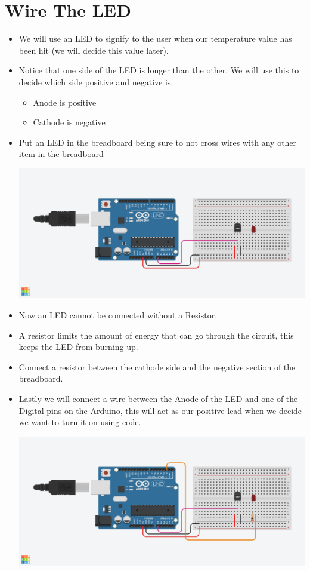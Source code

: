 \documentclass[12pt]{article}
\begin{document}
\section *{Wire The LED}
	\begin{itemize}
		\item We will use an LED to signify to the user when our temperature value has been hit (we will decide this value later). 
		\item Notice that one side of the LED is longer than the other. We will use this to decide which side positive and negative is.
		\begin{itemize}
			\item Anode is positive
			\item Cathode is negative
		\end{itemize}
		\item Put an LED in the breadboard being sure to not cross wires with any other item in the breadboard
		\begin{center}
			\includegraphics[scale = 0.3]{./Images/circuit4}
		\end{center}
		\item Now an LED cannot be connected without a Resistor.
		\item A resistor limits the amount of energy that can go through the circuit, this keeps the LED from burning up.
		\item Connect a resistor between the cathode side and the negative section of the breadboard.
		\item Lastly we will connect a wire between the Anode of the LED and one of the Digital pins on the Arduino, this will act as our positive lead when we decide we want to turn it on using code.
		\begin{center}
			\includegraphics[scale = 0.3]{./Images/circuit5}
		\end{center}
	\end{itemize}
	
\end{document}
